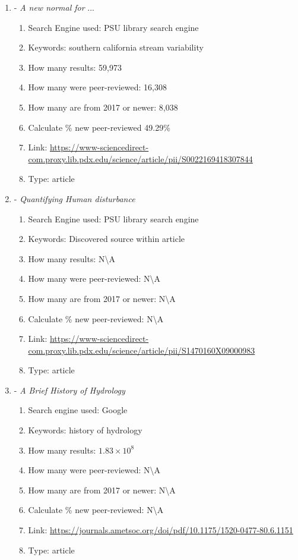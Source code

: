 \documentclass[a4paper,man,biblatex]{apa7}
\begin{document}
\begin{enumerate}
    \item \textcite{mallakpour_2018} - \textit{A new normal for} ... 
        \begin{enumerate}
            \item Search Engine used: PSU library search engine
            \item Keywords: southern california stream variability
            \item How many results: 59,973 
            \item How many were peer-reviewed: 16,308
            \item How many are from 2017 or newer: 8,038
            \item Calculate \% new peer-reviewed 49.29\%
            \item Link: \url{https://www-sciencedirect-com.proxy.lib.pdx.edu/science/article/pii/S0022169418307844}
            \item Type: article 
        \end{enumerate}

    \item \textcite{falcone_2016} - \textit{Quantifying Human disturbance}
        \begin{enumerate}
            \item Search Engine used: PSU library search engine
            \item Keywords: Discovered source within \textcite{rice_2016} article
            \item How many results: N\textbackslash A 
            \item How many were peer-reviewed: N\textbackslash A
            \item How many are from 2017 or newer:  N\textbackslash A
            \item Calculate \% new peer-reviewed: N\textbackslash A
            \item Link: \url{https://www-sciencedirect-com.proxy.lib.pdx.edu/science/article/pii/S1470160X09000983}
            \item Type: article 
        \end{enumerate}

    \item \textcite{bras_1999} - \textit{A  Brief  History  of  Hydrology}
        \begin{enumerate}
            \item Search engine used: Google
            \item Keywords: history of hydrology 
            \item How many results: $1.83\times 10^8$ 
            \item How many were peer-reviewed: N\textbackslash A
            \item How many are from 2017 or newer:  N\textbackslash A
            \item Calculate \% new peer-reviewed: N\textbackslash A
            \item Link: \url{https://journals.ametsoc.org/doi/pdf/10.1175/1520-0477-80.6.1151}
            \item Type: article 
        \end{enumerate}


\end{enumerate}
\end{document}
